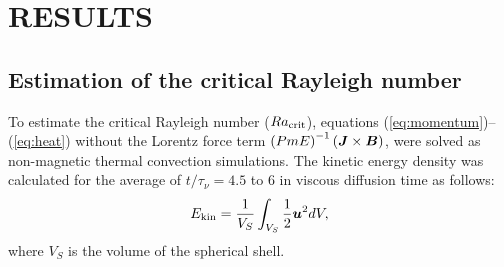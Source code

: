 \section{RESULTS}

\subsection{Estimation of the critical Rayleigh number}

To estimate the critical Rayleigh number ($Ra_{\rm crit}$), equations (\ref{eq:momentum})--(\ref{eq:heat}) without the Lorentz force term $\left(Pm E\right)^{-1} \left(\mbox{\boldmath$J$} \times \mbox{\boldmath$B$} \right)$, were solved as non-magnetic thermal convection simulations. The kinetic energy density was calculated for the average of $t / \tau_{\nu} = 4.5$ to 6 in viscous diffusion time as follows: 
%
\begin{equation}
E_{\rm kin} = \frac{1}{V_{S}} \int_{V_{S}} \frac{1}{2} \mbox{\boldmath$u$}^{2} dV,
\label{eq:kinetic_energy}
\end{equation}
%
where $V_{S}$ is the volume of the spherical shell.

